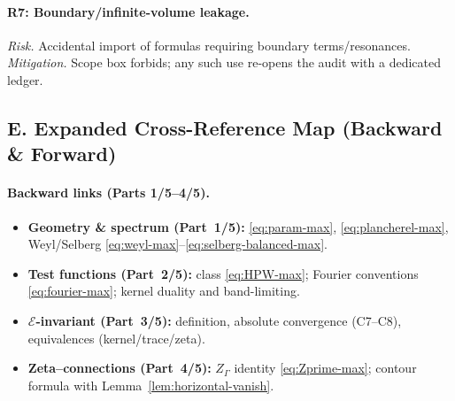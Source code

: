 \paragraph{R7: Boundary/infinite-volume leakage.}
\emph{Risk.} Accidental import of formulas requiring boundary terms/resonances.
\emph{Mitigation.} Scope box forbids; any such use re-opens the audit with a dedicated ledger.


\subsection*{E. Expanded Cross-Reference Map (Backward \& Forward)}
\label{subsec:crossmap-max}

\paragraph{Backward links (Parts 1/5–4/5).}
\begin{itemize}
  \item \textbf{Geometry \& spectrum (Part~1/5):} \eqref{eq:param-max}, \eqref{eq:plancherel-max}, Weyl/Selberg \eqref{eq:weyl-max}–\eqref{eq:selberg-balanced-max}.
  \item \textbf{Test functions (Part~2/5):} class \eqref{eq:HPW-max}; Fourier conventions \eqref{eq:fourier-max}; kernel duality and band-limiting.
  \item \textbf{$\mathcal E$-invariant (Part~3/5):} definition, absolute convergence (C7–C8), equivalences (kernel/trace/zeta).
  \item \textbf{Zeta–connections (Part~4/5):} $Z_\Gamma$ identity \eqref{eq:Zprime-max}; contour formula with Lemma~\ref{lem:horizontal-vanish}.
\end{itemize}


